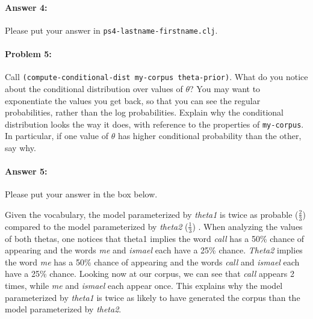 \documentclass[10pt]{article}
\newenvironment{AnswerBox}{\begin{mdframed}[style=simple]}{\end{mdframed}}
\newcommand{\PSnum}{4}
\begin{document}
\paragraph{Answer 4:} Please put your answer in
\texttt{ps\PSnum-lastname-firstname.clj}.

\hrulefill %

\paragraph{Problem 5:}
Call \texttt{(compute-conditional-dist my-corpus theta-prior)}. What
do you notice about the conditional distribution over values of
$\theta$?  You may want to exponentiate the values you get back, so
that you can see the regular probabilities, rather than the log
probabilities. Explain why the conditional distribution looks the way
it does, with reference to the properties of \texttt{my-corpus}.  In
particular, if one value of $\theta$ has higher conditional probability
than the other, say why.

\paragraph{Answer 5:} Please put your answer in the box below.

\begin{AnswerBox}%

    Given the vocabulary, the model parameterized by \textit{theta1} is twice as probable ($\frac{2}{3}$) compared to the model parameterized by \textit{theta2} ($\frac{1}{3}$) . When analyzing the values of both thetas, one notices that theta1 implies the word \textit{call} has a 50\% chance of appearing and the words \textit{me} and \textit{ismael} each have a 25\% chance.
    \textit{Theta2} implies the word \textit{me} has a 50\% chance of appearing and the words \textit{call} and \textit{ismael} each have a 25\% chance. Looking now at our corpus, we can see that \textit{call} appears 2 times, while \textit{me} and \textit{ismael} each appear once. This explains why the model parameterized by \textit{theta1} is twice as likely to have generated the corpus than the model parameterized by \textit{theta2}.
    
\end{AnswerBox}%

\hrulefill %
\end{document}

